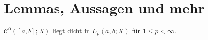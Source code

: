 
\section{Lemmas, Aussagen und mehr} %
\label{sec:lemmas_aussagen_und_mehr}

\begin{Lemma}
    $\mathcal C^{0}([a, b]; X)$ liegt dicht in $L_{p}(a, b; X)$ für $1 \leq p < \infty$.
\end{Lemma}

